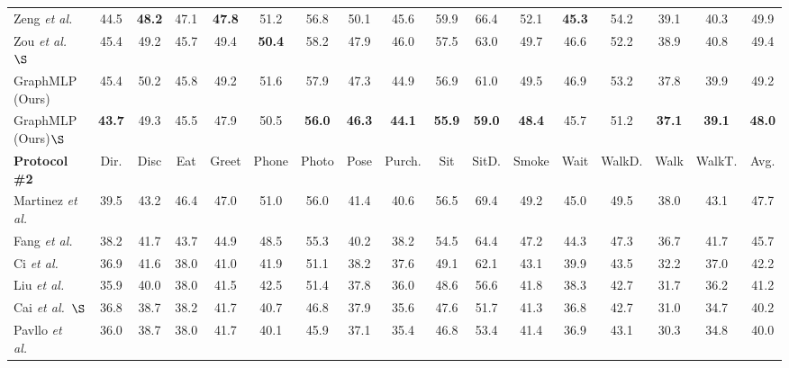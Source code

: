 \documentclass[lettersize,journal]{IEEEtran}
\begin{document}
\begin{table*}[tb]
{\begin{tabular}{@{}l|ccccccccccccccc|c@{}}
  Zeng \emph{et al.}~\cite{zeng2020srnet} &44.5& \textbf{48.2} &47.1 &\textbf{47.8} &51.2 &{56.8} &50.1& {45.6}& 59.9 &66.4 &52.1 &\textbf{45.3} &54.2 &39.1 &40.3 &49.9 \\

  Zou \emph{et al.}~\cite{zou2021modulated}$\S$ &45.4 &49.2 &45.7 &49.4 &\textbf{50.4} &58.2 &47.9 &46.0 &57.5 &63.0 &49.7 &46.6 &52.2 &38.9 &40.8 &49.4 \\

  \midrule
  
  GraphMLP (Ours) &{45.4} &{50.2} &{45.8} &{49.2} &{51.6} &{57.9} &{47.3} &{44.9} &{56.9} &{61.0} &{49.5} &{46.9} &{53.2} &{37.8} &{39.9} &{49.2} \\

  GraphMLP (Ours)$\S$ &\textbf{43.7} &{49.3} &{45.5} &{47.9} &{50.5} &\textbf{56.0} &\textbf{46.3} &\textbf{44.1} &\textbf{55.9} &\textbf{59.0} &\textbf{48.4} &{45.7} &{51.2} &\textbf{37.1} &\textbf{39.1} &\textbf{48.0} \\

  \toprule
  \textbf{Protocol \#2} & Dir. & Disc & Eat & Greet & Phone & Photo & Pose & Purch. & Sit & SitD. & Smoke & Wait & WalkD. & Walk & WalkT. & Avg. \\
  \midrule

  Martinez \emph{et al.}~\cite{simplebaseline} &39.5 &43.2 &46.4 &47.0 &51.0 &56.0 &41.4 &40.6 &56.5 &69.4 &49.2 &45.0 &49.5 &38.0 &43.1 &47.7 \\

  Fang \emph{et al.}~\cite{fang2018learning} &38.2 &41.7 &43.7 &44.9 &48.5 &55.3 &40.2 &38.2 &54.5 &64.4 &47.2 &44.3 &47.3 &36.7 &41.7 &45.7 \\

  Ci \emph{et al.}~\cite{ci2019optimizing} &36.9& 41.6& 38.0& 41.0& 41.9 &51.1 &38.2& 37.6& 49.1 &62.1 &43.1& 39.9& 43.5& 32.2& 37.0& 42.2 \\

  Liu \emph{et al.}~\cite{liu2020comprehensive} &35.9 &40.0 &38.0 &41.5 &42.5 &51.4 &37.8 &36.0 &48.6 &56.6 &41.8 &38.3 &42.7 &31.7 &36.2 &41.2 \\

  Cai \emph{et al.}~\cite{stgcn}$\S$ &36.8 &38.7 &38.2 &41.7 &40.7 &46.8 &37.9 &35.6 &47.6 &51.7 &41.3 &36.8 &42.7 &31.0 &34.7 &40.2 \\

  Pavllo \emph{et al.}~\cite{videopose} &36.0 &38.7 &38.0 &41.7 &40.1 &45.9 &37.1 &35.4 &46.8 &53.4 &41.4 &36.9 &43.1 &30.3 &34.8 &40.0 \\


\end{tabular}}
\end{table*}
\end{document}
